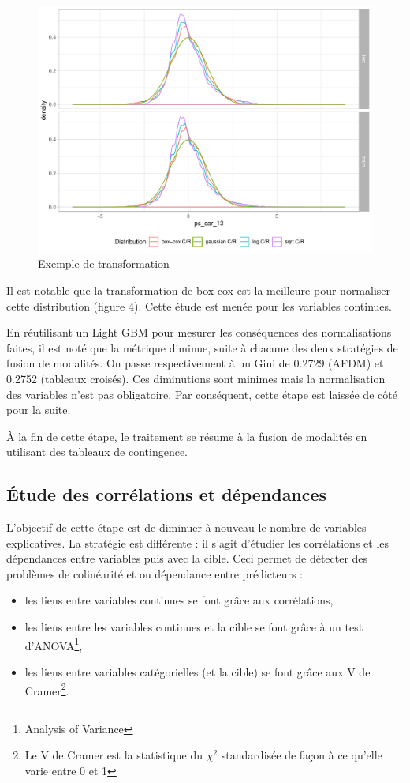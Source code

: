 \documentclass[french]{article}
\begin{document}
\begin{multicols}{2}
\begin{figure}[H] \centering
  \includegraphics[width = 0.99\columnwidth]{img/ex_normalisation}
  \caption{Exemple de transformation}
\end{figure}

Il est notable que la transformation de box-cox est la meilleure pour normaliser cette distribution (figure 4). Cette étude est menée pour les variables continues.

En réutilisant un Light GBM pour mesurer les conséquences des normalisations faites, il est noté que la métrique diminue, suite à chacune des deux stratégies de fusion de modalités. On passe respectivement à un Gini de 0.2729 (AFDM) et 0.2752 (tableaux croisés). Ces diminutions sont minimes mais la normalisation des variables n'est pas obligatoire. Par conséquent, cette étape est laissée de côté pour la suite. 

À la fin de cette étape, le traitement se résume à la fusion de modalités en utilisant des tableaux de contingence.

\subsection{Étude des corrélations et dépendances}

L'objectif de cette étape est de diminuer à nouveau le nombre de variables explicatives. La stratégie est différente : il s'agit d'étudier les corrélations et les dépendances entre variables puis avec la cible. Ceci permet de détecter des problèmes de colinéarité et ou dépendance entre prédicteurs :

\begin{itemize}
    \item les liens entre variables continues se font grâce aux corrélations,
    \item les liens entre les variables continues et la cible se font grâce à un test d'ANOVA\footnote{Analysis of Variance},
    \item les liens entre variables catégorielles (et la cible) se font grâce aux V de Cramer\footnote{Le V de Cramer est la statistique du $\chi^2$ standardisée de façon à ce qu'elle varie entre 0 et 1}.
\end{itemize}


\end{multicols}
\end{document}
